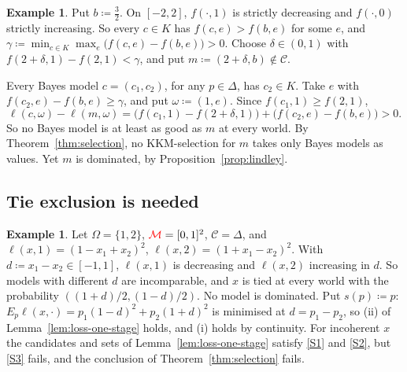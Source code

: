 \documentclass[11pt]{article}
\newcommand{\chg}[1]{{\color{red}#1}}
\newenvironment{chgblockb}{\color{red}}{}
\theoremstyle{definition}
\newtheorem{example}[theorem]{Example}
\theoremstyle{remark}
\newcommand{\M}{\mathcal M}
\newcommand{\C}{\mathcal C}
\begin{document}
\begin{chgblockb}
\begin{example}
Put $b\coloneqq\frac32$. On $[-2,2]$, $f(\cdot,1)$ is strictly decreasing and $f(\cdot,0)$ strictly increasing. So every $c\in K$ has $f(c,e)>f(b,e)$ for some $e$, and $\gamma\coloneqq\min_{c\in K}\max_e\bigl(f(c,e)-f(b,e)\bigr)>0$. Choose $\delta\in(0,1)$ with $f(2+\delta,1)-f(2,1)<\gamma$, and put $m\coloneqq(2+\delta,b)\notin\C$.

Every Bayes model $c=(c_1,c_2)$, for any $p\in\Delta$, has $c_2\in K$. Take $e$ with $f(c_2,e)-f(b,e)\ge\gamma$, and put $\omega\coloneqq(1,e)$. Since $f(c_1,1)\ge f(2,1)$,
\[
\ell(c,\omega)-\ell(m,\omega)=\bigl(f(c_1,1)-f(2+\delta,1)\bigr)+\bigl(f(c_2,e)-f(b,e)\bigr)>0.
\]
So no Bayes model is at least as good as $m$ at every world. By Theorem~\ref{thm:selection}, no KKM-selection for $m$ takes only Bayes models as values. Yet $m$ is dominated, by Proposition~\ref{prop:lindley}.
\end{example}
\end{chgblockb}

\subsection{Tie exclusion is needed}

\begin{example}\label{ex:ties}
Let $\Omega=\{1,2\}$, $\chg{\M}=[0,1]^2$, $\C=\Delta$, and $\ell(x,1)=(1-x_1+x_2)^2$, $\ell(x,2)=(1+x_1-x_2)^2$. With $d\coloneqq x_1-x_2\in[-1,1]$, $\ell(x,1)$ is decreasing and $\ell(x,2)$ increasing in $d$. So models with different $d$ are incomparable, and $x$ is tied at every world with the probability $((1+d)/2,(1-d)/2)$. No model is dominated. Put $s(p)\coloneqq p$: $E_p\ell(x,\cdot)=p_1(1-d)^2+p_2(1+d)^2$ is minimised at $d=p_1-p_2$, so (ii) of Lemma~\ref{lem:loss-one-stage} holds, and (i) holds by continuity. For incoherent $x$ the candidates and sets of Lemma~\ref{lem:loss-one-stage} satisfy \ref{S1} and \ref{S2}, but \ref{S3} fails, and the conclusion of Theorem~\ref{thm:selection} fails.
\end{example}



\end{document}
